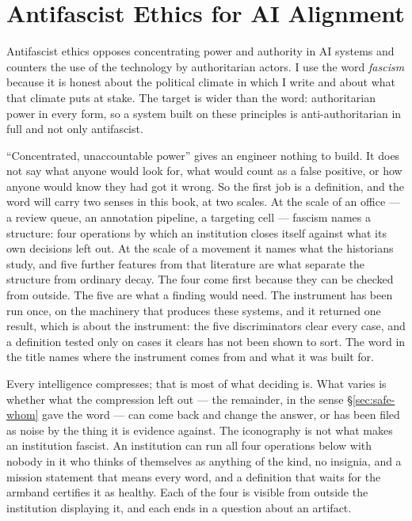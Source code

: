\section{Antifascist Ethics for AI Alignment}
\label{sec:antifascist-alignment}
Antifascist ethics opposes concentrating power and authority in AI systems and counters the use of the technology by authoritarian actors. I use the word \emph{fascism} because it is honest about the political climate in which I write and about what that climate puts at stake. The target is wider than the word: authoritarian power in every form, so a system built on these principles is anti-authoritarian in full and not only antifascist.

“Concentrated, unaccountable power” gives an engineer nothing to build. It does not say what anyone would look for, what would count as a false positive, or how anyone would know they had got it wrong. So the first job is a definition, and the word will carry two senses in this book, at two scales. At the scale of an office — a review queue, an annotation pipeline, a targeting cell — fascism names a structure: four operations by which an institution closes itself against what its own decisions left out. At the scale of a movement it names what the historians study, and five further features from that literature are what separate the structure from ordinary decay. The four come first because they can be checked from outside. The five are what a finding would need. The instrument has been run once, on the machinery that produces these systems, and it returned one result, which is about the instrument: the five discriminators clear every case, and a definition tested only on cases it clears has not been shown to sort. The word in the title names where the instrument comes from and what it was built for.

Every intelligence compresses; that is most of what deciding is. What varies is whether what the compression left out — the remainder, in the sense \S\ref{sec:safe-whom} gave the word — can come back and change the answer, or has been filed as noise by the thing it is evidence against. The iconography is not what makes an institution fascist. An institution can run all four operations below with nobody in it who thinks of themselves as anything of the kind, no insignia, and a mission statement that means every word, and a definition that waits for the armband certifies it as healthy. Each of the four is visible from outside the institution displaying it, and each ends in a question about an artifact.

